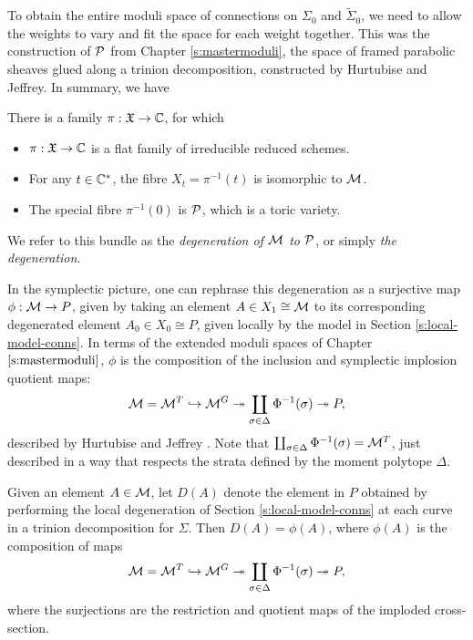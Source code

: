 	To obtain the entire moduli space of connections on $\Sigma_0$ and $\tilde{\Sigma}_0$, we need to allow the weights to vary and fit the space for each weight together. This was the construction of $\mathcal{P}$ from Chapter \ref{s:mastermoduli}, the space of framed parabolic sheaves glued along a trinion decomposition, constructed by Hurtubise and Jeffrey. In summary, we have \cite[Theorems 3.17, 4.1]{biswas_degenerations_2021}
	\begin{theorem}
		\label{t:bishurt}
		There is a family $\pi: \mathfrak{X} \to \mathbb{C}$, for which
		\begin{itemize}
			\item $\pi:\mathfrak{X}\to \mathbb{C}$ is a flat family of irreducible reduced schemes.
			\item For any $t\in \mathbb{C}^\ast$, the fibre $X_t = \pi^{-1}(t)$ is isomorphic to $\mathcal{M}$.
			\item The special fibre $\pi^{-1}(0)$ is $\mathcal{P}$, which is a toric variety.
		\end{itemize}
		We refer to this bundle as the \emph{degeneration of $\mathcal{M}$ to $\mathcal{P}$}, or simply \emph{the degeneration}.
	\end{theorem}
	In the symplectic picture, one can rephrase this degeneration as a surjective map $\phi:\mathcal{M}\to P$, given by taking an element $A\in X_1 \cong \mathcal{M}$ to its corresponding degenerated element $A_0 \in X_0 \cong P$, given locally by the model in Section \ref{s:local-model-conns}. In terms of the extended moduli spaces of Chapter $\ref{s:mastermoduli}$, $\phi$ is the composition of the inclusion and symplectic implosion quotient maps:
	\begin{equation}
		\mathcal{M} = \mathcal{M}^T \hookrightarrow \mathcal{M}^G \twoheadrightarrow \coprod_{\sigma \in \Delta} \Phi^{-1}(\sigma) \twoheadrightarrow P,
	\end{equation}
	described by Hurtubise and Jeffrey \cite[prop 2.37]{hurtubise_representations_2000}. Note that $\coprod_{\sigma \in \Delta} \Phi^{-1}(\sigma) = \mathcal{M}^T$, just described in a way that respects the strata defined by the moment polytope $\Delta$.
	\begin{lemma}
		\label{l:degen-equal}
		Given an element $A\in \mathcal{M}$, let $D(A)$ denote the element in $P$ obtained by performing the local degeneration of Section \ref{s:local-model-conns} at each curve in a trinion decomposition for $\Sigma$. Then $D(A) = \phi(A)$, where $\phi(A)$ is the composition of maps 
		\begin{equation}
		\mathcal{M} = \mathcal{M}^T \hookrightarrow \mathcal{M}^G \twoheadrightarrow \coprod_{\sigma \in \Delta} \Phi^{-1}(\sigma) \twoheadrightarrow P,
		\end{equation}
		where the surjections are the restriction and quotient maps of the imploded cross-section.
	\end{lemma}

